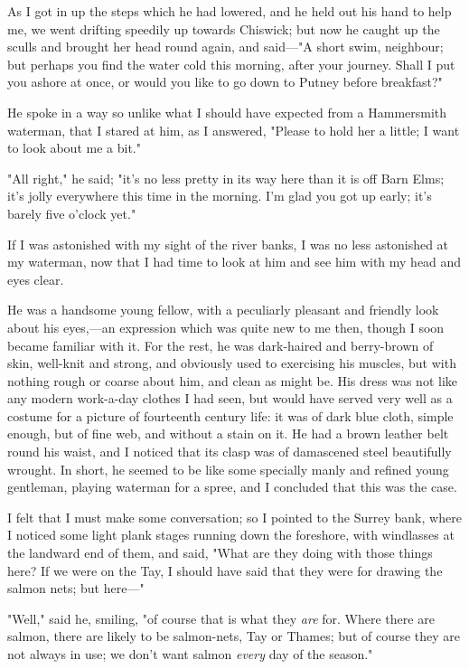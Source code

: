 As I got in up the steps which he had lowered, and he held out his hand
to help me, we went drifting speedily up towards Chiswick; but now he
caught up the sculls and brought her head round again, and said---"A
short swim, neighbour; but perhaps you find the water cold this morning,
after your journey. Shall I put you ashore at once, or would you like to
go down to Putney before breakfast?"

He spoke in a way so unlike what I should have expected from a
Hammersmith waterman, that I stared at him, as I answered, "Please to
hold her a little; I want to look about me a bit."

"All right," he said; "it's no less pretty in its way here than it is
off Barn Elms; it's jolly everywhere this time in the morning. I'm glad
you got up early; it's barely five o'clock yet."

If I was astonished with my sight of the river banks, I was no less
astonished at my waterman, now that I had time to look at him and see
him with my head and eyes clear.

He was a handsome young fellow, with a peculiarly pleasant and friendly
look about his eyes,---an expression which was quite new to me then,
though I soon became familiar with it. For the rest, he was dark-haired
and berry-brown of skin, well-knit and strong, and obviously used to
exercising his muscles, but with nothing rough or coarse about him, and
clean as might be. His dress was not like any modern work-a-day clothes
I had seen, but would have served very well as a costume for a picture
of fourteenth century life: it was of dark blue cloth, simple enough,
but of fine web, and without a stain on it. He had a brown leather belt
round his waist, and I noticed that its clasp was of damascened steel
beautifully wrought. In short, he seemed to be like some specially manly
and refined young gentleman, playing waterman for a spree, and I
concluded that this was the case.

I felt that I must make some conversation; so I pointed to the Surrey
bank, where I noticed some light plank stages running down the
foreshore, with windlasses at the landward end of them, and said, "What
are they doing with those things here? If we were on the Tay, I should
have said that they were for drawing the salmon nets; but here---"

"Well," said he, smiling, "of course that is what they \emph{are} for.
Where there are salmon, there are likely to be salmon-nets, Tay or
Thames; but of course they are not always in use; we don't want salmon
\emph{every} day of the season."

